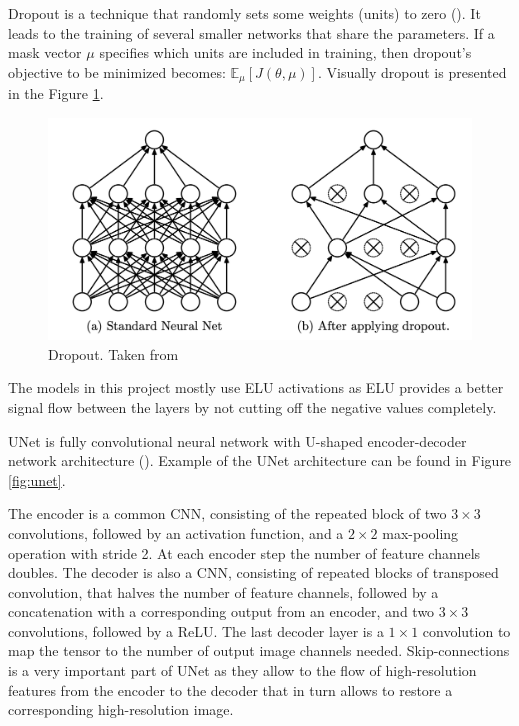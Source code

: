 \begin{definition}
	Dropout is a technique that randomly sets some weights (units) to zero (\cite{Srivastava_2014}). It leads to the training of several smaller networks that share the parameters. If a mask vector $\mu$ specifies which units are included in training, then dropout's objective to be minimized becomes: $\mathbb{E}_\mu \left[J(\theta, \mu)\right]$. Visually dropout is presented in the Figure \ref{fig:dropout}.
\end{definition}

\begin{figure}[H]
	\begin{center}
		\includegraphics[width=0.5\linewidth]{bilder/dropout.png}
		\caption[Dropout]%
		{Dropout. Taken from \cite{Srivastava_2014}}
		\label{fig:dropout}
	\end{center}
\end{figure}

The models in this project mostly use ELU activations as ELU provides a better signal flow between the layers by not cutting off the negative values completely.

\begin{definition}[UNet]
	UNet is fully convolutional neural network with U-shaped encoder-decoder network architecture (\cite{Ronneberger_2015}). Example of the UNet architecture can be found in Figure \ref{fig:unet}.
\end{definition}

The encoder is a common CNN, consisting of the repeated
block of two $3 \times 3$ convolutions, followed by
an activation function, and a $2 \times 2$ max-pooling operation with stride 2. At each encoder step  the number of feature channels doubles. The decoder is also a CNN, consisting of repeated blocks of transposed convolution, that halves the number of feature channels, followed by a concatenation with a corresponding output from an encoder, and two $3 \times 3$ convolutions, followed by a ReLU. The last decoder layer is a $1 \times 1$ convolution to map the tensor to the number of output image channels needed. Skip-connections is a very important part of UNet as they allow to the flow of high-resolution features from the encoder to the decoder that in turn allows to restore a corresponding high-resolution image.

